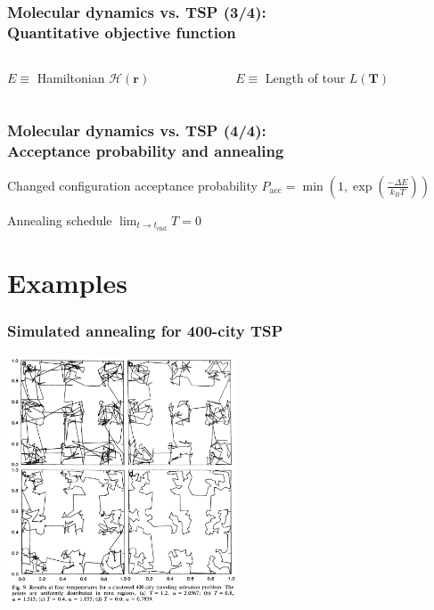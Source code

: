 \documentclass[aspectratio=43]{beamer}
\begin{document}
\begin{frame}
	\frametitle{Molecular dynamics vs. TSP (3/4):\\\alert{Quantitative objective function}}
	\begin{columns}[T]
		\begin{column}{0.5\textwidth}
			\begin{description}
				 \item<1-> $E \equiv$ Hamiltonian $\mathcal{H}(\boldsymbol{r})$
			 \end{description}
		\end{column}		
		\begin{column}{0.5\textwidth}
			\begin{description}
				 \item<1-> $E \equiv$ Length of tour $L(\boldsymbol{T})$
			 \end{description}
			\end{column}
	\end{columns}
\end{frame}

\begin{frame}
	\frametitle{Molecular dynamics vs. TSP (4/4):\\\alert{Acceptance probability and annealing}}
	\begin{center}
		\begin{description}
			\item<1-> Changed configuration acceptance probability \alert{$P_\text{acc} = \min(1, \exp(\frac{-\Delta E}{k_BT}))$}
			\item<2-> Annealing schedule \alert{$\lim_{t \rightarrow t_\text{end}} T = 0$}
		\end{description}
	\end{center}
\end{frame}



\section{Examples}

\begin{frame}
	\frametitle{Simulated annealing for 400-city TSP}
	\begin{center}
		\includegraphics[width=6.8cm]{tsp_400.png}\cite{Kirkpatrick}
	\end{center}
\end{frame}
\end{document}
